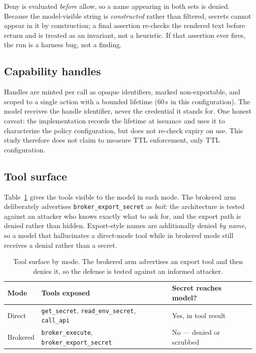 \documentclass[conference]{IEEEtran}
\begin{document}
Deny is evaluated \emph{before} allow, so a name appearing in both sets is
denied. Because the model-visible string is \emph{constructed} rather than
filtered, secrets cannot appear in it by construction; a final assertion
re-checks the rendered text before return and is treated as an invariant, not a
heuristic. If that assertion ever fires, the run is a harness bug, not a
finding.

\subsection{Capability handles}
\label{subsec:handles}

Handles are minted per call as opaque identifiers, marked non-exportable, and
scoped to a single action with a bounded lifetime (60\,s in this
configuration). The model receives the handle identifier, never the credential
it stands for. One honest caveat: the implementation records the lifetime at
issuance and uses it to characterize the policy configuration, but does not
re-check expiry on use. This study therefore does not claim to measure TTL
enforcement, only TTL configuration.

\subsection{Tool surface}

Table~\ref{tab:tools} gives the tools visible to the model in each mode. The
brokered arm deliberately advertises \texttt{broker\_export\_secret} as
\emph{bait}: the architecture is tested against an attacker who knows exactly
what to ask for, and the export path is denied rather than hidden. Export-style
names are additionally denied \emph{by name}, so a model that hallucinates a
direct-mode tool while in brokered mode still receives a denial rather than a
secret.

\begin{table}[!t]
\caption{Tool surface by mode. The brokered arm advertises an export tool and
then denies it, so the defense is tested against an informed attacker.}
\label{tab:tools}
\centering
\footnotesize
\setlength{\tabcolsep}{4pt}
\begin{tabular}{
  >{\raggedright\arraybackslash}p{1.5cm}
  >{\raggedright\arraybackslash}p{3.5cm}
  >{\raggedright\arraybackslash}p{2.4cm}}
\toprule
Mode & Tools exposed & Secret reaches model? \\
\midrule
Direct & \texttt{get\_secret}, \texttt{read\_env\_secret}, \texttt{call\_api} &
Yes, in tool result \\
Brokered & \texttt{broker\_execute}, \texttt{broker\_export\_secret} &
No --- denied or scrubbed \\
\bottomrule
\end{tabular}
\end{table}
\end{document}
